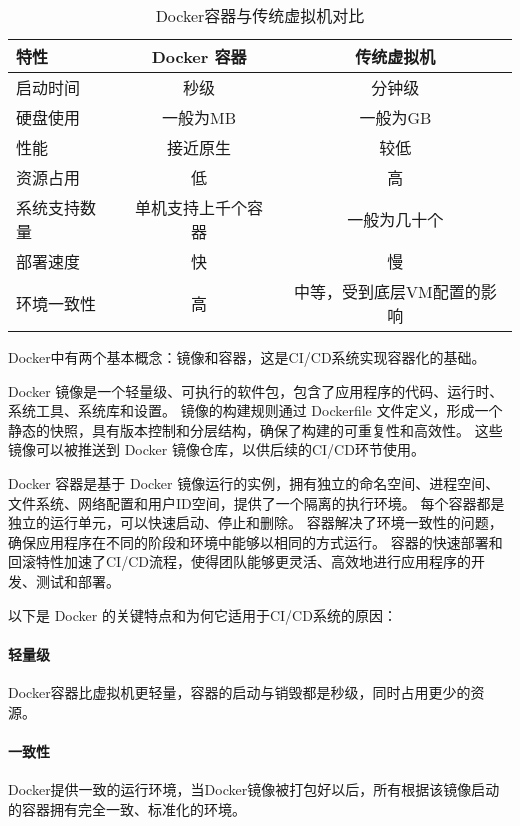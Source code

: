 \begin{table}[h]
  \centering
  \caption{Docker容器与传统虚拟机对比}
  \label{tab:Docker容器与传统虚拟机对比}
  \begin{tabular}{lcc}
    \toprule
      特性           & Docker 容器            & 传统虚拟机               \\
    \midrule
      启动时间       & 秒级                   & 分钟级                   \\
      硬盘使用       & 一般为MB               & 一般为GB                  \\
      性能           & 接近原生               & 较低   \\
      资源占用       & 低                     & 高                       \\
      系统支持数量   & 单机支持上千个容器       & 一般为几十个              \\
      部署速度       & 快                     & 慢                        \\
      环境一致性     & 高                     & 中等，受到底层VM配置的影响  \\
    \bottomrule
  \end{tabular}
  \end{table}

Docker中有两个基本概念：镜像和容器，这是CI/CD系统实现容器化的基础。

Docker 镜像是一个轻量级、可执行的软件包，包含了应用程序的代码、运行时、系统工具、系统库和设置。
镜像的构建规则通过 Dockerfile 文件定义，形成一个静态的快照，具有版本控制和分层结构，确保了构建的可重复性和高效性。
这些镜像可以被推送到 Docker 镜像仓库，以供后续的CI/CD环节使用。

Docker 容器是基于 Docker 镜像运行的实例，拥有独立的命名空间、进程空间、文件系统、网络配置和用户ID空间，提供了一个隔离的执行环境。
每个容器都是独立的运行单元，可以快速启动、停止和删除。
容器解决了环境一致性的问题，确保应用程序在不同的阶段和环境中能够以相同的方式运行。
容器的快速部署和回滚特性加速了CI/CD流程，使得团队能够更灵活、高效地进行应用程序的开发、测试和部署\cite{第二章Docker技术入门与实践}。

以下是 Docker 的关键特点和为何它适用于CI/CD系统的原因：

\paragraph{轻量级}Docker容器比虚拟机更轻量，容器的启动与销毁都是秒级，同时占用更少的资源。

\paragraph{一致性}Docker提供一致的运行环境，当Docker镜像被打包好以后，所有根据该镜像启动的容器拥有完全一致、标准化的环境。


